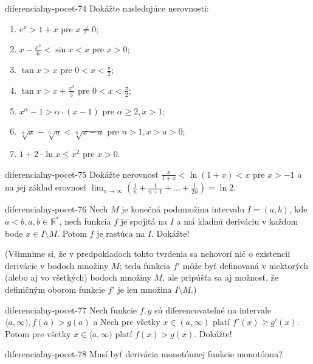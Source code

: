 \begin{defproblem}{diferencialny-pocet-74}
Dokážte nasledujúce nerovnosti:
\begin{enumerate}
\item $e^x>1+x$ pre $x\neq 0$;
\item $x-\frac{x^3}{6}<\sin x<x$ pre $x>0$;
\item $\tan x>x$ pre $0<x<\frac{\pi}{2}$;
\item $\tan x>x+\frac{x^3}{3}$ pre $0<x<\frac{\pi}{2}$;
\item $x^{\alpha}-1>\alpha\cdot(x-1)$ pre $\alpha\geq 2,x>1$;
\item $\sqrt[n]{x}-\sqrt[n]{a}<\sqrt[n]{x-a}$ pre $n>1,x>a>0$;
\item $1+2\cdot\ln x\leq x^2$ pre $x>0$.
\end{enumerate}
\end{defproblem}

\begin{defproblem}{diferencialny-pocet-75}
Dokážte nerovnosť $\frac{x}{1+x}<\ln (1+x)<x$ pre $x>-1$ a na jej základ erovnosť $\lim_{n \rightarrow \infty}(\frac{1}{n}+\frac{1}{n+1}+...+\frac{1}{2n})=\ln 2$.
\end{defproblem}

\begin{defproblem}{diferencialny-pocet-76}
Nech $M$ je konečná podmnožina intervalu $I=(a,b)$, kde $a<b,a,b\in\mathbb{R^*}$, nech funkcia $f$ je spojitá na $I$ a má kladnú deriváciu v každom bode $x\in I \setminus M$. Potom $f$ je rastúca na $I$. Dokážte!

(Všimnime si, že v predpokladoch tohto tvrdenia sa nehovorí nič o existencii derivácie v bodoch množiny $M$; teda funkcia $f'$ môže byť definovaná v niektorých (alebo aj vo všetkých) bodoch množiny $M$, ale pripúšťa sa aj možnosť, že definičným oborom funkcie $f'$ je len množina $I \setminus M$.)
\end{defproblem}

\begin{defproblem}{diferencialny-pocet-77}
Nech funkcie $f,g$ sú diferencovateľné na intervale $\langle a,\infty),f(a)>g(a)$ a Nech pre všetky $x\in (a,\infty)$ platí $f'(x)\geq g'(x)$. Potom pre všetky $x\in \langle a,\infty)$ platí $f(x)>g(x)$. Dokážte!
\end{defproblem}

\begin{defproblem}{diferencialny-pocet-78}
Musí byť derivácia monotónnej funkcie monotónna?
\end{defproblem}

